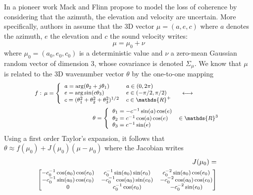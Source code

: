 In a pioneer work Mack and Flinn \cite{mack_flinn:1971} propose to model the loss of coherence by considering that the azimuth, the elevation and velocity are uncertain. More specifically, authors in \cite{nouvellet:2012}  assume that the 3D vector $\mu=(a,e,c)$ where $a$ denotes the azimuth, $e$ the elevation and $c$ the sound velocity writes:
\begin{equation}
 \label{eq:randomnesswn}
 \mu=\mu_{0}+\nu
\end{equation} 
where $\mu_{0}=(a_{0},e_{0},c_{0})$ is a deterministic value and $\nu$ a zero-mean Gaussian random vector of dimension 3, whose covariance is denoted $\Sigma_{\mu}$. We know that $\mu$ is related to the 3D wavenumber vector $\theta$ by the one-to-one mapping 
\begin{eqnarray*}
 \label{eq:tehtaxyz}
 {\footnotesize
 \begin{array}{rcl}
 f:\,
  \mu= 
 \left\{
 \begin{array}{ll}
 a=\arg(\theta_{2}+j\theta_{1})&a\in(0,2\pi)
 \\
 e=\arg\sin(c\theta_{3})&e\in(-\pi/2,\pi/2)
 \\
 c=(\theta_{1}^{2}+\theta_{2}^{2}+\theta_{3}^{2})^{1/2}&c\in\mathds{R}^{+}
 \end{array}\right.
 &
 \longleftrightarrow\vspace{6pt}
 \\ 
 &&\hspace{-5.5cm}
 \,\theta=\left\{
 \begin{array}{ll}
 \theta_{1}=-c^{-1}\sin(a)\cos(e)
 \\
 \theta_{2}=c^{-1}\cos(a)\cos(e)&\in\mathds{R}^{3}
 \\
 \theta_{3}=c^{-1}\sin(e) 
 \end{array}\right.
 \end{array}}
\end{eqnarray*}
Using a first order Taylor's expansion, it follows that $\theta\approx f(\mu_{0})+J(\mu_{0})(\mu-\mu_{0})$ where the Jacobian writes
\begin{eqnarray*}
 &&J(\mu_{0}) =
 \\
 &&\hspace{-0.5cm}
 {\footnotesize
 \begin{bmatrix}
 -c_{0}^{-1}\cos(a_{0})\cos(e_{0})&
 c_{0}^{-1}\sin(a_{0})\sin(e_{0})&
 c_{0}^{-2}\sin(a_{0})\cos(e_{0})
 \\
 -c_{0}^{-1}\sin(a_{0})\cos(e_{0})&
 -c_{0}^{-1}\cos(a_{0})\sin(e_{0})&
 -c_{0}^{-2}\cos(a_{0})\cos(e_{0})
 \\
 0& 
 c_{0}^{-1}\cos(e_{0})&
 -c_{0}^{-2}\sin(e_{0})
 \end{bmatrix}}
\end{eqnarray*}
